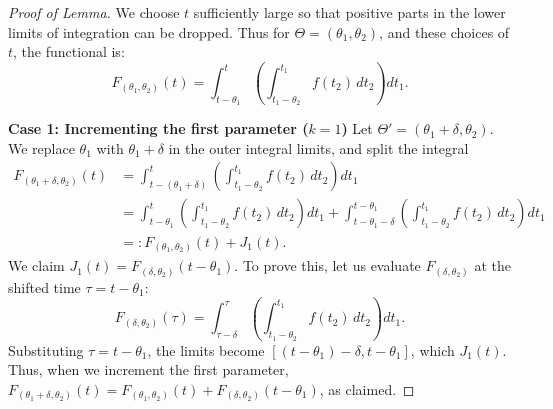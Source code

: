 \documentclass[10pt,reqno]{amsart}
\theoremstyle{definition}
\begin{document}
\begin{proof}[Proof of Lemma]
	We choose $t$ sufficiently large so that 
	positive parts in the lower limits of integration can be dropped. Thus for $\Theta = (\theta_1, \theta_2)$, and these choices of $t$, the functional is:
	\[
	F_{(\theta_1, \theta_2)}(t) = \int_{t-\theta_1}^t \left( \int_{t_1-\theta_2}^{t_1} f(t_2) \, dt_2 \right) dt_1.
	\]
	
	\textbf{Case 1: Incrementing the first parameter ($k=1$)}
	Let $\Theta' = (\theta_1 + \delta, \theta_2)$. We replace $\theta_1$ with $\theta_1+\delta$ in the outer integral limits, and split the integral
	\begin{align*}
	F_{(\theta_1+\delta, \theta_2)}(t) 
	&= \int_{t-(\theta_1+\delta)}^t \left( \int_{t_1-\theta_2}^{t_1} f(t_2) \, dt_2 \right) dt_1\\
	&= \int_{t-\theta_1}^t \left( \int_{t_1-\theta_2}^{t_1} f(t_2) \, dt_2 \right) dt_1 + \int_{t-\theta_1-\delta}^{t-\theta_1} \left( \int_{t_1-\theta_2}^{t_1} f(t_2) \, dt_2 \right) dt_1\\
	&=:F_{(\theta_1,\theta_2)}(t)+J_1(t).
	\end{align*}
	We claim $J_1(t)=F_{(\delta, \theta_2)}(t-\theta_1)$.
	To prove this, let us evaluate $F_{(\delta, \theta_2)}$ at the shifted time $\tau = t-\theta_1$:
		\[
		F_{(\delta, \theta_2)}(\tau) = \int_{\tau-\delta}^\tau \left( \int_{t_1-\theta_2}^{t_1} f(t_2) \, dt_2 \right) dt_1.
		\]
		Substituting $\tau = t-\theta_1$, the limits become $[(t-\theta_1)-\delta, t-\theta_1]$, which $J_1(t)$.
	Thus, when we increment the first parameter, $F_{(\theta_1+\delta, \theta_2)}(t) = F_{(\theta_1, \theta_2)}(t) + F_{(\delta, \theta_2)}(t-\theta_1)$, as claimed.
	

\end{proof}
\end{document}
